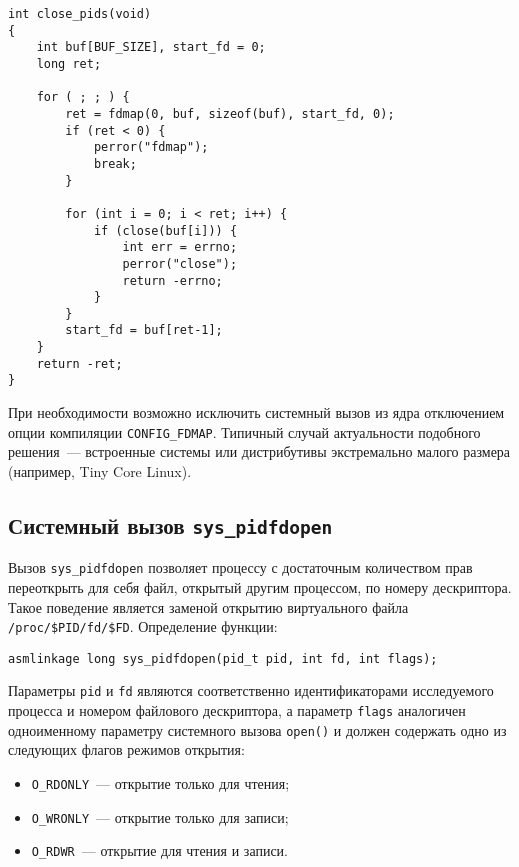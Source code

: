 \medskip
\begin{lstlisting}[style=cstyle]
int close_pids(void)
{
	int buf[BUF_SIZE], start_fd = 0;
	long ret;

	for ( ; ; ) {
		ret = fdmap(0, buf, sizeof(buf), start_fd, 0);
		if (ret < 0) {
			perror("fdmap");
			break;
		}

		for (int i = 0; i < ret; i++) {
			if (close(buf[i])) {
				int err = errno;
				perror("close");
				return -errno;
			}
		}
		start_fd = buf[ret-1];
	}
	return -ret;
}
\end{lstlisting}
\medskip

При необходимости возможно исключить системный вызов из ядра отключением опции
компиляции \texttt{CONFIG\_FDMAP}. Типичный случай актуальности подобного
решения~--- встроенные системы или дистрибутивы экстремально малого размера
(например, Tiny Core Linux).

\subsection{Системный вызов \texttt{sys\_pidfdopen}}

Вызов \texttt{sys\_pidfdopen} позволяет процессу с достаточным количеством прав
переоткрыть для себя файл, открытый другим процессом, по номеру дескриптора.
Такое поведение является заменой открытию виртуального файла
\texttt{/proc/\$PID/fd/\$FD}. Определение функции: 

\medskip
\begin{lstlisting}[style=cstyle]
asmlinkage long sys_pidfdopen(pid_t pid, int fd, int flags);
\end{lstlisting}
\medskip

Параметры \texttt{pid} и \texttt{fd} являются соответственно идентификаторами
исследуемого процесса и номером файлового дескриптора, а параметр
\texttt{flags} аналогичен одноименному параметру системного вызова
\texttt{open()} и должен содержать одно из следующих флагов режимов открытия:
\begin{itemize}
\item \texttt{O\_RDONLY}~--- открытие только для чтения;
\item \texttt{O\_WRONLY}~--- открытие только для записи;
\item \texttt{O\_RDWR}~--- открытие для чтения и записи.
\end{itemize}

